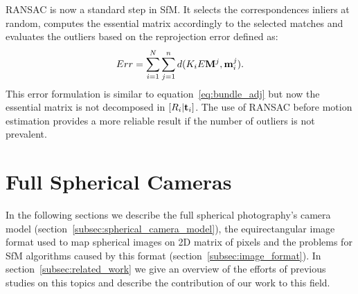 RANSAC is now a standard step in SfM. It selects the correspondences inliers at
random, computes the essential matrix accordingly to the selected matches and
evaluates the outliers based on the reprojection error defined as:
\begin{equation*}
	Err =  
	\sum_{i = 1}^N\sum_{j = 1}^n 
	d(K_iE\mathbf{M}^j, \mathbf{m}_i^j) \text{.}
\end{equation*}
This error formulation is similar to equation~\ref{eq:bundle_adj} but now the
essential matrix is not decomposed in $[R_i|\mathbf{t}_i]$.
The use of RANSAC before motion estimation provides a more reliable result if
the number of outliers is not prevalent.

\section{Full Spherical Cameras}
In the following sections we describe the full spherical photography's camera
model (section~\ref{subsec:spherical_camera_model}), the equirectangular image
format used to map spherical images on 2D matrix of pixels 
and the problems for SfM algorithms caused by this format 
(section~\ref{subsec:image_format}).
In section~\ref{subsec:related_work} we give an overview of the efforts of 
previous studies on this topics and describe the contribution of our work to 
this field.

